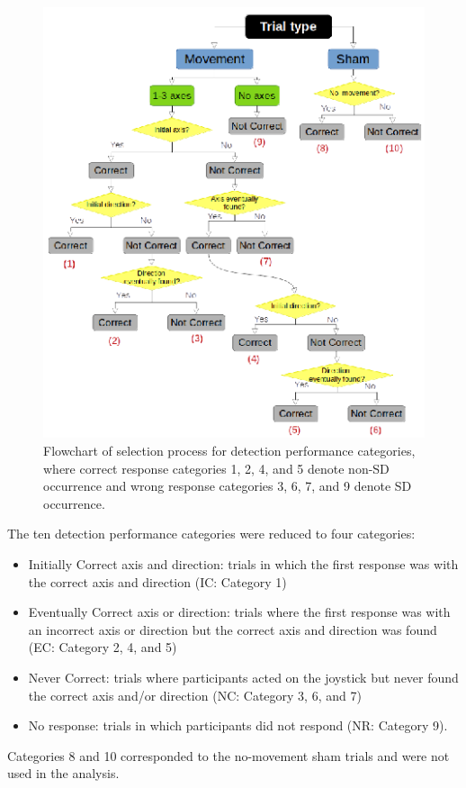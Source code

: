 \documentclass{ieeeaccess}
\begin{document}
\begin{figure}[htp]
\begin{center}
\includegraphics[width=1.0\linewidth]{figures/figure4_2.eps}
\end{center}
\caption{Flowchart of selection process for detection performance categories, where correct response categories 1, 2, 4, and 5 denote non-SD occurrence and wrong response categories 3, 6, 7, and 9 denote SD occurrence.}
\label{fig4}
\end{figure}
The ten detection performance categories were reduced to four categories:
\begin{itemize}
\item Initially Correct axis and direction: trials in which the first response was with the correct axis and direction (IC: Category 1)
\item Eventually Correct axis or direction: trials where the first response was with an incorrect axis or direction but the correct axis and direction was found (EC: Category 2, 4, and 5)
\item Never Correct: trials where participants acted on the joystick but never found the correct axis and/or direction (NC: Category 3, 6, and 7)
\item No response: trials in which participants did not respond (NR: Category 9). 
\end{itemize}
Categories 8 and 10 corresponded to the no-movement sham trials and were not used in the analysis.
\end{document}
